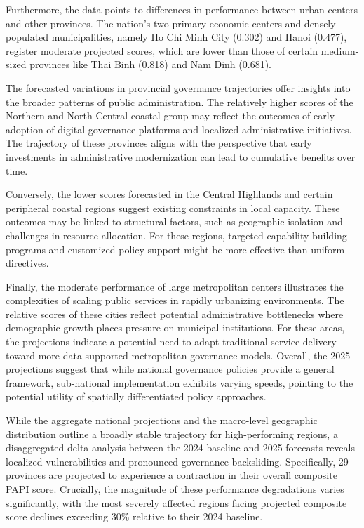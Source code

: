 \documentclass[12pt,a4paper]{article}
\begin{document}
Furthermore, the data points to differences in performance between urban centers and other provinces. The nation's two primary economic centers and densely populated municipalities, namely Ho Chi Minh City (0.302) and Hanoi (0.477), register moderate projected scores, which are lower than those of certain medium-sized provinces like Thai Binh (0.818) and Nam Dinh (0.681). 

The forecasted variations in provincial governance trajectories offer insights into the broader patterns of public administration. The relatively higher scores of the Northern and North Central coastal group may reflect the outcomes of early adoption of digital governance platforms and localized administrative initiatives. The trajectory of these provinces aligns with the perspective that early investments in administrative modernization can lead to cumulative benefits over time.

Conversely, the lower scores forecasted in the Central Highlands and certain peripheral coastal regions suggest existing constraints in local capacity. These outcomes may be linked to structural factors, such as geographic isolation and challenges in resource allocation. For these regions, targeted capability-building programs and customized policy support might be more effective than uniform directives.

Finally, the moderate performance of large metropolitan centers illustrates the complexities of scaling public services in rapidly urbanizing environments. The relative scores of these cities reflect potential administrative bottlenecks where demographic growth places pressure on municipal institutions. For these areas, the projections indicate a potential need to adapt traditional service delivery toward more data-supported metropolitan governance models. Overall, the 2025 projections suggest that while national governance policies provide a general framework, sub-national implementation exhibits varying speeds, pointing to the potential utility of spatially differentiated policy approaches.

While the aggregate national projections and the macro-level geographic distribution outline a broadly stable trajectory for high-performing regions, a disaggregated delta analysis between the 2024 baseline and 2025 forecasts reveals localized vulnerabilities and pronounced governance backsliding. Specifically, 29 provinces are projected to experience a contraction in their overall composite PAPI score. Crucially, the magnitude of these performance degradations varies significantly, with the most severely affected regions facing projected composite score declines exceeding 30\% relative to their 2024 baseline.
\end{document}
